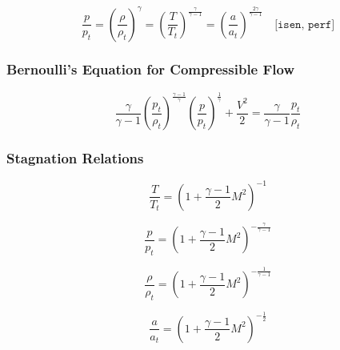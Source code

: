 \begin{equation}
	\frac{p}{p_t} = \left( \frac{\rho}{\rho_t} \right)^\gamma = \left( \frac{T}{T_t} \right)^{\frac{\gamma}{\gamma - 1}} = \left( \frac{a}{a_t} \right)^{\frac{2\gamma}{\gamma - 1}} \quad \texttt{[isen, perf]}
\end{equation}

\subsubsection*{Bernoulli's Equation for Compressible Flow}

\begin{equation}
	\frac{\gamma}{\gamma - 1} \left( \frac{p_t}{\rho_t} \right)^{\frac{\gamma - 1}{\gamma}} \left( \frac{p}{p_t} \right)^{\frac{1}{\gamma}} + \frac{V^2}{2} = \frac{\gamma}{\gamma - 1} \frac{p_t}{\rho_t}
\end{equation}

\subsubsection*{Stagnation Relations}

\begin{equation}
	\frac{T}{T_t} = \left( 1 + \frac{\gamma - 1}{2} M^2 \right)^{-1}
	\label{eq:total_relation_T}
\end{equation}

\begin{equation}
	\frac{p}{p_t} = \left( 1 + \frac{\gamma - 1}{2} M^2 \right)^{-\frac{\gamma}{\gamma - 1}}
	\label{eq:total_relation_p}
\end{equation}

\begin{equation}
	\frac{\rho}{\rho_t} = \left( 1 + \frac{\gamma - 1}{2} M^2 \right)^{-\frac{1}{\gamma - 1}}
	\label{eq:total_relation_rho}
\end{equation}

\begin{equation}
	\frac{a}{a_t} = \left( 1 + \frac{\gamma - 1}{2} M^2 \right)^{-\frac{1}{2}}
\end{equation}
